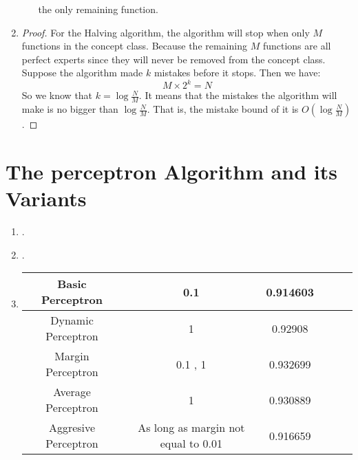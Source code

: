 \documentclass{article}
\begin{document}
\begin{enumerate}
\begin{enumerate}
\begin{algorithm}[H]
\begin{algorithmic}[1]
			\State \Return the only remaining function.
        \end{algorithmic}
        \end{algorithm}
		\end{enumerate}
	\item \begin{proof}
		For the Halving algorithm, the algorithm will stop when only $M$ functions in the concept class. Because the remaining  $M$ functions are all perfect experts since they will never be removed from the concept class. Suppose the algorithm made $k$ mistakes before it stops. Then we have:
		\begin{equation}
			M \times 2^k = N
		\end{equation}
		So we know that $k = \log{\frac{N}{M}}$. It means that the mistakes the algorithm will make is no bigger than $\log{\frac{N}{M}}$. That is, the mistake bound of it is $O(\log{\frac{N}{M}})$.
	\end{proof}
	\end{enumerate}
	\section{The perceptron Algorithm and its Variants}
	\begin{enumerate}
		\item .
		\item .
		\item \begin{tabular}{|c|c|c|c|c|c|}
		\hline
			Basic Perceptron & 0.1 & 0.914603 \\
		\hline
			Dynamic Perceptron & 1 & 0.92908\\
		\hline
			Margin Perceptron & 0.1 , 1& 0.932699\\
		\hline 
			Average Perceptron & 1 & 0.930889\\
		\hline
			Aggresive Perceptron & As long as margin not equal to 0.01  & 0.916659\\
		\hline
		\end{tabular}
	\end{enumerate}
\end{document}
